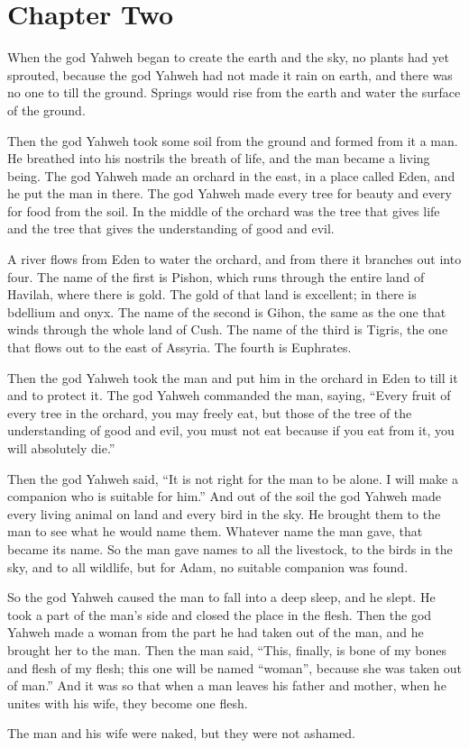 \chapter*{Chapter Two}

When the god Yahweh began to create the earth and the sky, no plants had yet 
sprouted, because the god Yahweh had not made it rain on earth, 
and there was no one to till the ground.  Springs would rise from the earth 
and water the surface of the ground.

Then the god Yahweh took some soil from the ground and formed from it a man.  
He breathed into his nostrils the breath of life, and the man became 
a living being.  The god Yahweh made an orchard in the east, in a place called 
Eden, and he put the man in there.  The god Yahweh made every tree for beauty 
and every for food from the soil.  In the middle of the orchard was the tree that
gives life and the tree that gives the understanding of good and evil.

A river flows from Eden to water the orchard, and from there it branches out 
into four.  The name of the first is Pishon, which runs through the entire land 
of Havilah, where there is gold.  The gold of that land is excellent; in there is 
bdellium and onyx.  The name of the second is Gihon, the same as the one that 
winds through the whole land of Cush.  The name of the third is Tigris, the one 
that flows out to the east of Assyria.  The fourth is Euphrates.

Then the god Yahweh took the man and put him in the orchard in Eden to till it 
and to protect it.  The god Yahweh commanded the man, saying, 
\enquote{Every fruit of every tree in the orchard, you may freely eat, but 
those of the tree of the understanding of good and evil, you must not eat 
because if you eat from it, you will absolutely die.}

Then the god Yahweh said, \enquote{It is not right for the man to be alone.  
I will make a companion who is suitable for him.} And out of the soil the god 
Yahweh made every living animal on land and every bird in the sky.  He brought 
them to the man to see what he would name them.  Whatever name the man gave, 
that became its name.  So the man gave names to all the livestock, to the birds 
in the sky, and to all wildlife, but for Adam, no suitable companion was found.

So the god Yahweh caused the man to fall into a deep sleep, and he slept.  He 
took a part of the man’s side and closed the place in the flesh.  Then the god 
Yahweh made a woman from the part he had taken out of the man, and he brought 
her to the man.  Then the man said, \enquote{This, finally, is bone of my bones 
and flesh of my flesh; this one will be named “woman”, because she was taken out 
of man.} And it was so that when a man leaves his father and mother, when he 
unites with his wife, they become one flesh.  

The man and his wife were naked, but they were not ashamed.
